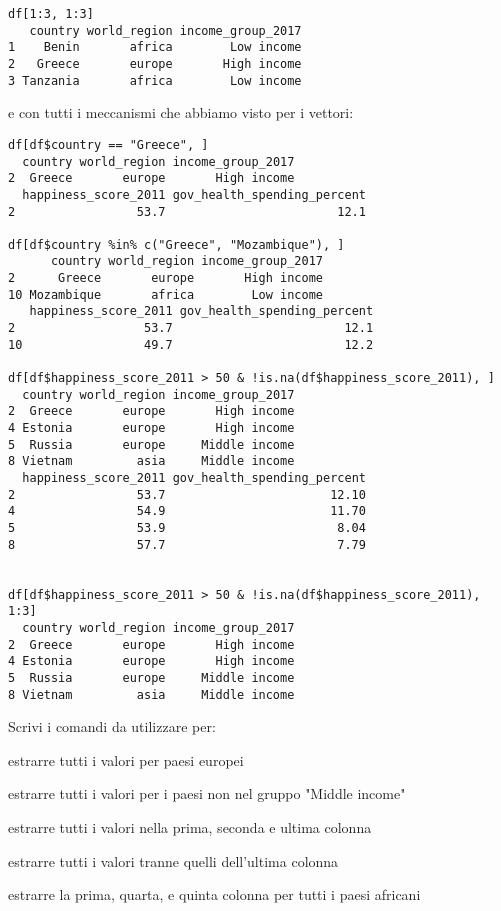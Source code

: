 {{{{\begin{lstlisting}[style=Rstyle]
df[1:3, 1:3]
   country world_region income_group_2017
1    Benin       africa        Low income
2   Greece       europe       High income
3 Tanzania       africa        Low income
\end{lstlisting}
%
e con tutti i meccanismi che abbiamo visto per i vettori:

\begin{lstlisting}[style=Rstyle]
df[df$country == "Greece", ]
  country world_region income_group_2017
2  Greece       europe       High income
  happiness_score_2011 gov_health_spending_percent
2                 53.7                        12.1

df[df$country %in% c("Greece", "Mozambique"), ]
      country world_region income_group_2017
2      Greece       europe       High income
10 Mozambique       africa        Low income
   happiness_score_2011 gov_health_spending_percent
2                  53.7                        12.1
10                 49.7                        12.2

df[df$happiness_score_2011 > 50 & !is.na(df$happiness_score_2011), ]
  country world_region income_group_2017
2  Greece       europe       High income
4 Estonia       europe       High income
5  Russia       europe     Middle income
8 Vietnam         asia     Middle income
  happiness_score_2011 gov_health_spending_percent
2                 53.7                       12.10
4                 54.9                       11.70
5                 53.9                        8.04
8                 57.7                        7.79


df[df$happiness_score_2011 > 50 & !is.na(df$happiness_score_2011), 1:3]
  country world_region income_group_2017
2  Greece       europe       High income
4 Estonia       europe       High income
5  Russia       europe     Middle income
8 Vietnam         asia     Middle income
\end{lstlisting}


\vspace{0.5cm} 

\begin{exercise}\label{ex3.6}

\noindent Scrivi i comandi da utilizzare per:

\begin{myenumerate}
	\item estrarre tutti i valori per paesi europei
	\item estrarre tutti i valori per i paesi non nel gruppo "Middle income"
	\item estrarre tutti i valori nella prima, seconda e ultima colonna
	\item estrarre tutti i valori tranne quelli dell'ultima colonna
	\item estrarre la prima, quarta, e quinta colonna per tutti i paesi africani
\end{myenumerate}


\end{exercise}}}}}
